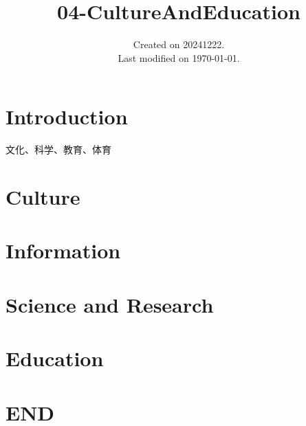 \documentclass[UTF8]{../ApplicationUniverse}
\begin{document}
\title{04-CultureAndEducation}
\date{Created on 20241222.\\   Last modified on \today.}
\maketitle
\tableofcontents


\chapter{Introduction}


文化、科学、教育、体育



\chapter{Culture}%


\chapter{Information}%


\chapter{Science and Research}%


\chapter{Education}%



\chapter{END}
\end{document}
